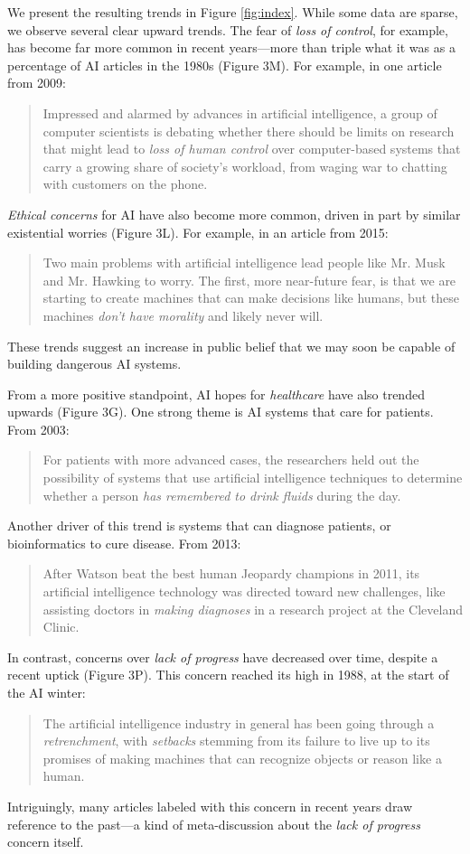\documentclass[letterpaper]{article}
\begin{document}
We present the resulting trends in Figure \ref{fig:index}. While some data are sparse, we observe several clear upward trends. The fear of \textit{loss of control}, for example, has become far more common in recent years---more than triple what it was as a percentage of AI articles in the 1980s (Figure 3M). For example, in one article from 2009:
\begin{quote}
\small
Impressed and alarmed by advances in artificial intelligence, a group of computer scientists is debating whether there should be limits on research that might lead to \textit{loss of human control} over computer-based systems that carry a growing share of society's workload, from waging war to chatting with customers on the phone.
\normalsize
\end{quote}
\textit{Ethical concerns} for AI have also become more common, driven in part by similar existential worries (Figure 3L). For example, in an article from 2015:
\begin{quote}
\small
Two main problems with artificial intelligence lead people like Mr. Musk and Mr. Hawking to worry. The first, more near-future fear, is that we are starting to create machines that can make decisions like humans, but these machines \textit{don't have morality} and likely never will.
\normalsize
\end{quote}
These trends suggest an increase in public belief that we may soon be capable of building dangerous AI systems.

From a more positive standpoint, AI hopes for \textit{healthcare} have also trended upwards (Figure 3G). One strong theme is AI systems that care for patients. From 2003:
\begin{quote}
\small
For patients with more advanced cases, the researchers held out the possibility of systems that use artificial intelligence techniques to determine whether a person \textit{has remembered to drink fluids} during the day.
\normalsize
\end{quote}
Another driver of this trend is systems that can diagnose patients, or bioinformatics to cure disease. From 2013:
\begin{quote}
\small
After Watson beat the best human Jeopardy champions in 2011, its artificial intelligence technology was directed toward new challenges, like assisting doctors in \textit{making diagnoses} in a research project at the Cleveland Clinic.
\normalsize
\end{quote}

In contrast, concerns over \textit{lack of progress} have decreased over time, despite a recent uptick (Figure 3P). This concern reached its high in 1988, at the start of the AI winter:
\begin{quote}
\small
The artificial intelligence industry in general has been going through a \textit{retrenchment}, with \textit{setbacks} stemming from its failure to live up to its promises of making machines that can recognize objects or reason like a human.
\normalsize
\end{quote}
Intriguingly, many articles labeled with this concern in recent years draw reference to the past---a kind of meta-discussion about the \textit{lack of progress} concern itself.
\end{document}
